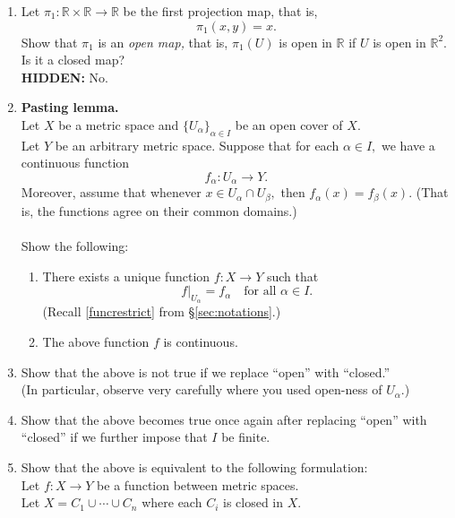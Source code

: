 \documentclass[12pt]{article}
\theoremstyle{definition}
\numberwithin{thm}{section}
\newcommand{\hint}[1]{\textbf{HIDDEN:} {\color[rgb]{0.95, 0.95, 0.95}#1}}
\begin{document}
\begin{enumerate}
	\item \label{q:openmap} Let $\pi_1:\mathbb{R} \times \mathbb{R} \to \mathbb{R}$ be the first projection map, that is,
	\begin{equation*} 
		\pi_1(x, y) = x.
	\end{equation*}
	Show that $\pi_1$ is an \emph{open map,} that is, $\pi_1(U)$ is open in $\mathbb{R}$ if $U$ is open in $\mathbb{R}^2.$\\
	Is it a closed map?\\
	\hint{No.}
	\item \textbf{Pasting lemma.}\\
	Let $X$ be a metric space and $\{U_\alpha\}_{\alpha \in I}$ be an open cover of $X.$\\
	Let $Y$ be an arbitrary metric space. Suppose that for each $\alpha \in I,$ we have a continuous function
	\begin{equation*} 
		f_\alpha:U_\alpha \to Y.
	\end{equation*}
	Moreover, assume that whenever $x \in U_\alpha \cap U_\beta,$ then $f_\alpha(x) = f_\beta(x).$ (That is, the functions agree on their common domains.)\\~\\
	Show the following:
	\begin{enumerate}
		\item There exists a unique function $f:X \to Y$ such that 
		\begin{equation*} 
			f|_{U_\alpha} = f_\alpha \quad \text{for all } \alpha \in I.
		\end{equation*}
		(Recall \ref{funcrestrict} from \S\ref{sec:notations}.)
		\item The above function $f$ is continuous.
	\end{enumerate}
	\item Show that the above is not true if we replace ``open'' with ``closed.'' \\
	(In particular, observe very carefully where you used open-ness of $U_\alpha.$)
	\item Show that the above becomes true once again after replacing ``open'' with ``closed'' if we further impose that $I$ be finite. 
	\item Show that the above is equivalent to the following formulation:\\
	Let $f:X \to Y$ be a function between metric spaces.\\
	Let $X = C_1 \cup \cdots \cup C_n$ where each $C_i$ is closed in $X.$\\

\end{enumerate}
\end{document}
